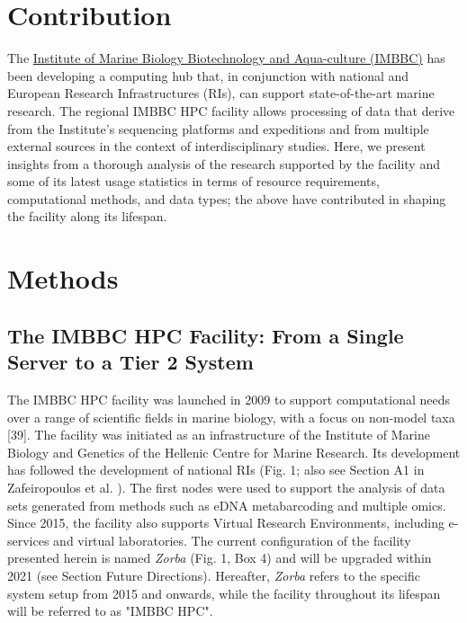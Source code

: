    \section{Contribution}

   The \href{https://imbbc.hcmr.gr/}{Institute of Marine Biology Biotechnology and Aqua-culture (IMBBC)} 
   has been developing a computing hub that, in conjunction with national and European Research Infrastructures (RIs), 
   can support state-of-the-art marine research. 
   The regional IMBBC HPC facility allows processing of data that derive from the Institute's sequencing platforms 
   and expeditions and from multiple external sources in the context of interdisciplinary studies. 
   Here, we present insights from a thorough analysis of the research supported by the facility and some 
   of its latest usage statistics in terms of resource requirements, computational methods, and data types; 
   the above have contributed in shaping the facility along its lifespan.


   \section{Methods}

   \subsection{The IMBBC HPC Facility: From a Single Server to a Tier 2 System}

   The IMBBC HPC facility was launched in 2009 to support computational needs over a range of scientific 
   fields in marine biology, with a focus on non-model taxa [39]. 
   The facility was initiated as an infrastructure of the Institute of Marine Biology and Genetics of 
   the Hellenic Centre for Marine Research.
   Its development has followed the development of national RIs (Fig. 1; 
   also see Section A1 in Zafeiropoulos et al. \citep{haris_zafeiropoulos_2021_4665308}). 
   The first nodes were used to support the analysis of data sets generated from methods such as eDNA metabarcoding and multiple omics. 
   Since 2015, the facility also supports Virtual Research Environments, including e-services and virtual laboratories. 
   The current configuration of the facility presented herein is named \textit{Zorba} (Fig. 1, Box 4) and will be upgraded within 2021 (see Section Future Directions). 
   Hereafter, \textit{Zorba} refers to the specific system setup from 2015 and onwards, while the facility throughout its lifespan will be referred to as "IMBBC HPC".

